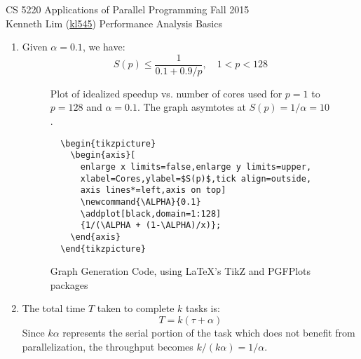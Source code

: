 \documentclass{scrartcl}
\begin{document}
  \begin{framed}
  \large
  CS 5220 Applications of Parallel Programming \hfill Fall 2015 \\
  Kenneth Lim (\href{mailto:kl545@cornell.edu}{kl545}) \hfill Performance Analysis Basics \hspace{-3ex}
  \end{framed}
  \begin{enumerate}
    \item Given $\alpha = 0.1$, we have:
    \[
      S(p) \leq \frac{1}{0.1 + 0.9/p},\quad 1<p<128
    \]
    \begin{figure}[p]
      \centering
    \caption{Plot of idealized speedup vs. number of cores used for $p = 1$ to $p = 128$ and $\alpha = 0.1$. The graph asymtotes at $S(p) = 1/\alpha = 10$.\label{fig:amdahl}}
    \end{figure}
    \begin{figure}[p]
\begin{lstlisting}
  \begin{tikzpicture}
    \begin{axis}[
      enlarge x limits=false,enlarge y limits=upper,
      xlabel=Cores,ylabel=$S(p)$,tick align=outside,
      axis lines*=left,axis on top]
      \newcommand{\ALPHA}{0.1}
      \addplot[black,domain=1:128]
      {1/(\ALPHA + (1-\ALPHA)/x)};
    \end{axis}
  \end{tikzpicture}
\end{lstlisting}
    \caption{Graph Generation Code, using \LaTeX's TikZ and PGFPlots packages\label{code:amdahl}}
    \end{figure}
    \item The total time $T$ taken to complete $k$ tasks is:
    \[
      T = k(\tau + \alpha)
    \]
    Since $k\alpha$ represents the serial portion of the task which does not benefit from parallelization, the throughput becomes $k/(k\alpha) = 1/\alpha$.

\end{enumerate}
\end{document}
